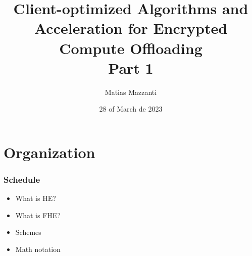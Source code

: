 \documentclass[10pt,handout]{beamer}
\title[CHACO]{Client-optimized Algorithms and Acceleration for Encrypted Compute Offloading \\
Part 1}
\author[Matias Mazzanti]{Matias Mazzanti}
\institute{}
\date{28 of March de 2023}
\begin{document}
\begin{frame}

\maketitle

\end{frame}


\section{Organization}


\begin{frame}
    \frametitle{Schedule}

    \begin{itemize}
        \item What is HE?
        \item What is FHE?
        \item Schemes
        \item Math notation
    \end{itemize}


\end{frame}
\end{document}
